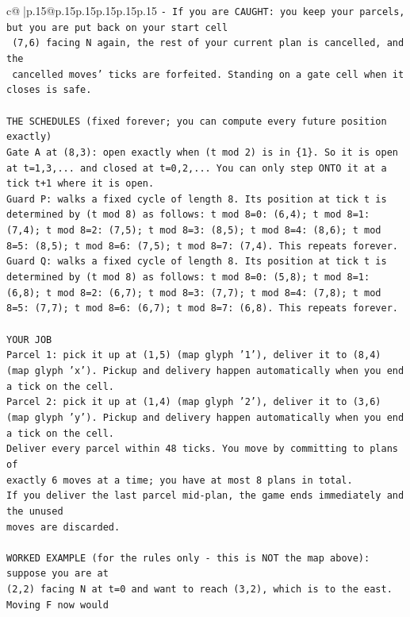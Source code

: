 \documentclass{article}
\begin{document}
{\begin{supertabular}{c@{$\;$}|p{.15\linewidth}@{}p{.15\linewidth}p{.15\linewidth}p{.15\linewidth}p{.15\linewidth}p{.15\linewidth}}
{{{\texttt{{-} If you are CAUGHT: you keep your parcels, but you are put back on your start cell} \\
\texttt{  (7,6) facing N again, the rest of your current plan is cancelled, and the} \\
\texttt{  cancelled moves' ticks are forfeited. Standing on a gate cell when it closes is safe.} \\
\\ 
\texttt{THE SCHEDULES (fixed forever; you can compute every future position exactly)} \\
\texttt{Gate A at (8,3): open exactly when (t mod 2) is in \{1\}. So it is open at t=1,3,... and closed at t=0,2,... You can only step ONTO it at a tick t+1 where it is open.} \\
\texttt{Guard P: walks a fixed cycle of length 8. Its position at tick t is determined by (t mod 8) as follows: t mod 8=0: (6,4); t mod 8=1: (7,4); t mod 8=2: (7,5); t mod 8=3: (8,5); t mod 8=4: (8,6); t mod 8=5: (8,5); t mod 8=6: (7,5); t mod 8=7: (7,4). This repeats forever.} \\
\texttt{Guard Q: walks a fixed cycle of length 8. Its position at tick t is determined by (t mod 8) as follows: t mod 8=0: (5,8); t mod 8=1: (6,8); t mod 8=2: (6,7); t mod 8=3: (7,7); t mod 8=4: (7,8); t mod 8=5: (7,7); t mod 8=6: (6,7); t mod 8=7: (6,8). This repeats forever.} \\
\\ 
\texttt{YOUR JOB} \\
\texttt{Parcel 1: pick it up at (1,5) (map glyph '1'), deliver it to (8,4) (map glyph 'x'). Pickup and delivery happen automatically when you end a tick on the cell.} \\
\texttt{Parcel 2: pick it up at (1,4) (map glyph '2'), deliver it to (3,6) (map glyph 'y'). Pickup and delivery happen automatically when you end a tick on the cell.} \\
\texttt{Deliver every parcel within 48 ticks. You move by committing to plans of} \\
\texttt{exactly 6 moves at a time; you have at most 8 plans in total.} \\
\texttt{If you deliver the last parcel mid{-}plan, the game ends immediately and the unused} \\
\texttt{moves are discarded.} \\
\\ 
\texttt{WORKED EXAMPLE (for the rules only {-} this is NOT the map above): suppose you are at} \\
\texttt{(2,2) facing N at t=0 and want to reach (3,2), which is to the east. Moving F now would} \\
}}}
\end{supertabular}}
\end{document}
